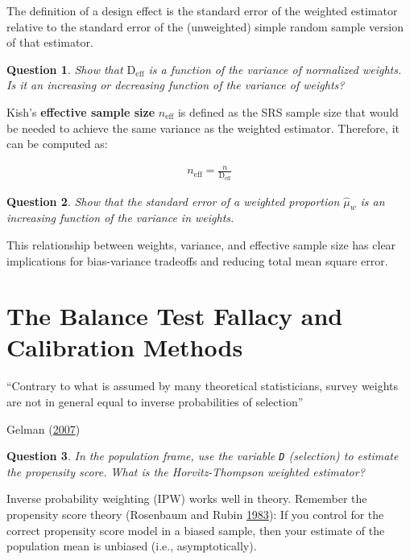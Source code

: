 \documentclass[10pt, letterpaper]{article}
\theoremstyle{mytheoremstyle}
\newtheorem{question}{Question}[section]
\begin{document}
The definition of a design effect is the standard error of the weighted estimator relative to the standard error of the (unweighted) simple random sample version of that estimator.

\begin{question}
Show that $\text{D}_{\text{eff}}$ is a function of the variance of normalized weights. Is it an increasing or decreasing function of the variance of weights?
\end{question}

\vspace{0.5in}

Kish's \textbf{effective sample size} $n_{\text{eff}}$ is defined as the SRS sample size that would be needed to achieve the same variance as the weighted estimator.  Therefore, it can be computed as:

\begin{align}
n_{\text{eff}} = \frac{n}{\text{D}_{\text{eff}}}
\end{align}

\begin{question}
Show that the standard error of a weighted proportion $\widehat{\mu}_w$ is an increasing function of the variance in weights.
\end{question}

\vspace{0.1in}


This relationship between weights, variance, and effective sample size has clear implications for bias-variance tradeoffs and reducing total mean square error.



\section{The Balance Test Fallacy and Calibration Methods}

\epigraph{``Contrary to what is assumed by many theoretical statisticians, survey weights are not in general equal to inverse probabilities of selection''}{Gelman (\href{http://www.stat.columbia.edu/~gelman/research/published/STS226.pdf}{2007})}

\begin{question}
In the population frame, use the variable \texttt{D} (selection) to estimate the propensity score.  What is the Horvitz-Thompson weighted estimator?
\end{question}

Inverse probability weighting (IPW) works well in theory. Remember the propensity score theory (Rosenbaum and Rubin \href{https://academic.oup.com/biomet/article/70/1/41/240879}{1983}): If you control for the correct propensity score model in a biased sample, then your estimate of the population mean is unbiased (i.e., asymptotically). 
\end{document}
